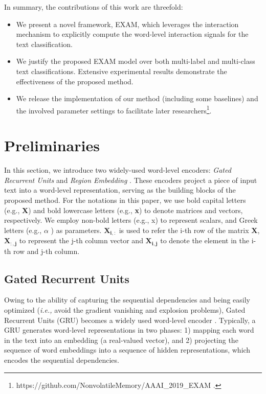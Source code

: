 \documentclass[letterpaper]{article} \usepackage{aaai19}  \usepackage{times}  \usepackage{helvet}  \usepackage{courier}  \usepackage{url}  \usepackage{graphicx}
\newcommand{\ie}{\emph{i.e., }}
\begin{document}
In summary, the contributions of this work are threefold: 
\begin{itemize}
\item  We present a novel framework, EXAM, which leverages the interaction mechanism to explicitly compute the word-level interaction signals for the text classification.
\item We justify the proposed EXAM model over both multi-label and multi-class text classifications. Extensive experimental results demonstrate the effectiveness of the proposed method.
\item We release the implementation of our method (including some baselines) and the involved parameter settings to facilitate later researchers\footnote{https://github.com/NonvolatileMemory/AAAI\_2019\_EXAM .}.
\end{itemize}

\section{Preliminaries}
In this section, we introduce two widely-used word-level encoders: \textit{Gated Recurrent Units} \cite{GRU} and \textit{Region Embedding} \cite{regionemb}. These encoders project a piece of input text into a word-level representation, serving as the building blocks of the proposed method. 
For the notations in this paper,
we use bold capital letters (e.g., \textbf{X}) and bold lowercase letters (e.g., \textbf{x}) to denote matrices and vectors, respectively. We employ non-bold letters (e.g., x) to represent scalars, and Greek letters (e.g., $\alpha$ ) as parameters. $\mathbf{X_{i,:}}$ is used to refer the i-th row of the matrix $\mathbf{X}$, $\mathbf{X_{:,j}}$ to represent the j-th column vector and $\mathbf{X_{i,j}}$ to denote the element in the i-th row and j-th column. 

\subsection{Gated Recurrent Units} 
Owing to the ability of capturing the sequential dependencies and being easily optimized (\ie avoid the gradient vanishing and explosion problems), Gated Recurrent Units (GRU) becomes a widely used word-level encoder \cite{TextRNN,dlstm}. 
Typically, a GRU generates word-level representations in two phases: 1) mapping each word in the text into an embedding (a real-valued vector), and 2) projecting the sequence of word embeddings into a sequence of hidden representations, which encodes the sequential dependencies.
\end{document}
